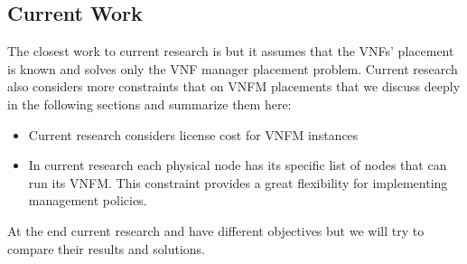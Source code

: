 \subsection{Current Work}

The closest work to current research is \cite{AbuLebdeh2017} but it assumes that the VNFs' placement is known and solves only the VNF manager placement problem. Current research also considers more constraints that \cite{AbuLebdeh2017} on VNFM placements that we discuss deeply in the following sections and summarize them here:

\begin{itemize}
    \item Current research considers license cost for VNFM instances
    \item In current research each physical node has its specific list of nodes that can run its VNFM. This constraint provides a great flexibility for implementing management policies.
\end{itemize}

At the end current research and \cite{AbuLebdeh2017} have different objectives but we will try to compare their results and solutions.

